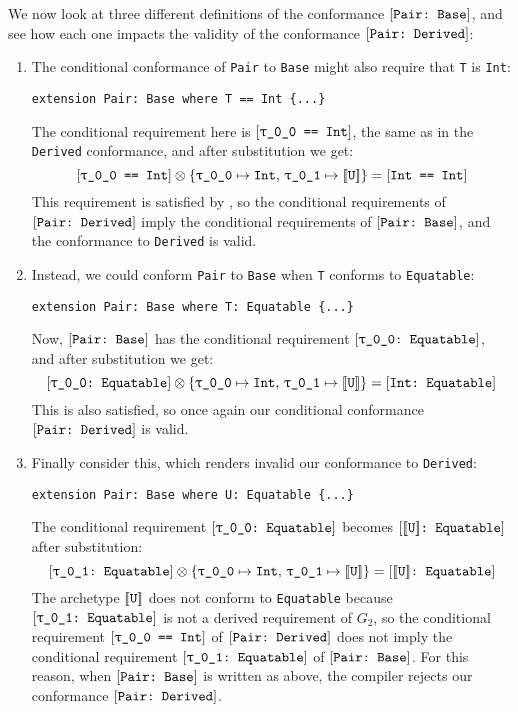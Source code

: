 \documentclass[../generics]{subfiles}
\begin{document}
We now look at three different definitions of the conformance $[\texttt{Pair:~Base}]$, and see how each one impacts the validity of the conformance $[\texttt{Pair:~Derived}]$:
\begin{enumerate}
\item
The conditional conformance of \texttt{Pair} to \texttt{Base} might also require that \texttt{T} is \texttt{Int}:
\begin{Verbatim}
extension Pair: Base where T == Int {...}
\end{Verbatim}
The conditional requirement here is $\SameReq{\ttgp{0}{0}}{Int}$, the same as in the \texttt{Derived} conformance, and after substitution we get:
\[\SameReq{\ttgp{0}{0}}{Int}\otimes \SubstMap{\SubstType{\ttgp{0}{0}}{Int},\,\SubstType{\ttgp{0}{1}}{$\archetype{U}$}}=\SameReq{Int}{Int}\]
This requirement is satisfied by , so the conditional requirements of $[\texttt{Pair:~Derived}]$ imply the conditional requirements of $[\texttt{Pair:~Base}]$, and the conformance to \texttt{Derived} is valid.

\item Instead, we could conform \texttt{Pair} to \texttt{Base} when \texttt{T} conforms to \texttt{Equatable}:
\begin{Verbatim}
extension Pair: Base where T: Equatable {...}
\end{Verbatim}
Now, $[\texttt{Pair:~Base}]$ has the conditional requirement $\ConfReq{\ttgp{0}{0}}{Equatable}$, and after substitution we get:
\[\ConfReq{\ttgp{0}{0}}{Equatable}\otimes\SubstMap{\SubstType{\ttgp{0}{0}}{Int},\,\SubstType{\ttgp{0}{1}}{$\archetype{U}$}}=\ConfReq{Int}{Equatable}\]
This is also satisfied, so once again our conditional conformance $[\texttt{Pair:~Derived}]$ is valid.

\item Finally consider this, which renders invalid our conformance to \texttt{Derived}:
\begin{Verbatim}
extension Pair: Base where U: Equatable {...}
\end{Verbatim}
The conditional requirement $\ConfReq{\ttgp{0}{0}}{Equatable}$ becomes $[\texttt{$[\![\texttt{U}]\!]$:~Equatable}]$ after substitution:
\[\ConfReq{\ttgp{0}{1}}{Equatable}\otimes \SubstMap{\SubstType{\ttgp{0}{0}}{Int},\,\SubstType{\ttgp{0}{1}}{$\archetype{U}$}}=\ConfReq{$\archetype{U}$}{Equatable}\]
The archetype $[\![\texttt{U}]\!]$ does not conform to \texttt{Equatable} because $\ConfReq{\ttgp{0}{1}}{Equatable}$ is not a derived requirement of $G_2$, so the conditional requirement $\SameReq{\ttgp{0}{0}}{Int}$ of $[\texttt{Pair:~Derived}]$ does not imply the conditional requirement $\ConfReq{\ttgp{0}{1}}{Equatable}$ of $[\texttt{Pair:~Base}]$. For this reason, when $[\texttt{Pair:~Base}]$ is written as above, the compiler rejects our conformance $[\texttt{Pair:~Derived}]$.
\end{enumerate}
\end{document}
